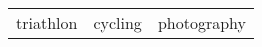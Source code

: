 \vspace{\sectionpadding}

\parbox[t]{\textwidth}{
    \begin{tabularx}{\textwidth}{>{\raggedright\arraybackslash}X >{\centering\arraybackslash}X >{\raggedleft\arraybackslash}X}
        triathlon & cycling & photography \\
    \end{tabularx}
    \vspace{1ex}
}
